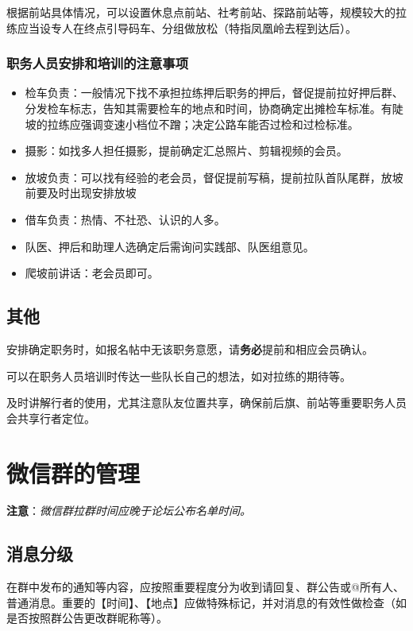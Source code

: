 \documentclass[UTF8]{ctexart}
\begin{document}
根据前站具体情况，可以设置休息点前站、社考前站、探路前站等，规模较大的拉练应当设专人在终点引导码车、分组做放松（特指凤凰岭去程到达后）。

\subsubsection{职务人员安排和培训的注意事项}

\begin{itemize}[nosep,left=2em]
    \item 检车负责：一般情况下找不承担拉练押后职务的押后，督促提前拉好押后群、分发检车标志，告知其需要检车的地点和时间，协商确定出摊检车标准。有陡坡的拉练应强调变速小档位不蹭；决定公路车能否过检和过检标准。
    \item 摄影：如找多人担任摄影，提前确定汇总照片、剪辑视频的会员。
    \item 放坡负责：可以找有经验的老会员，督促提前写稿，提前拉队首队尾群，放坡前要及时出现安排放坡
    \item 借车负责：热情、不社恐、认识的人多。
    \item 队医、押后和助理人选确定后需询问实践部、队医组意见。
    \item 爬坡前讲话：老会员即可。
\end{itemize}

\subsection{其他}

安排确定职务时，如报名帖中无该职务意愿，请\textbf{务必}提前和相应会员确认。

可以在职务人员培训时传达一些队长自己的想法，如对拉练的期待等。

及时讲解行者的使用，尤其注意队友位置共享，确保前后旗、前站等重要职务人员会共享行者定位。

\section{微信群的管理}
\textbf{注意}：\textit{微信群拉群时间应晚于论坛公布名单时间。}

\subsection{消息分级}

在群中发布的通知等内容，应按照重要程度分为收到请回复、群公告或@所有人、普通消息。重要的【时间】、【地点】应做特殊标记，并对消息的有效性做检查（如是否按照群公告更改群昵称等）。
\end{document}
